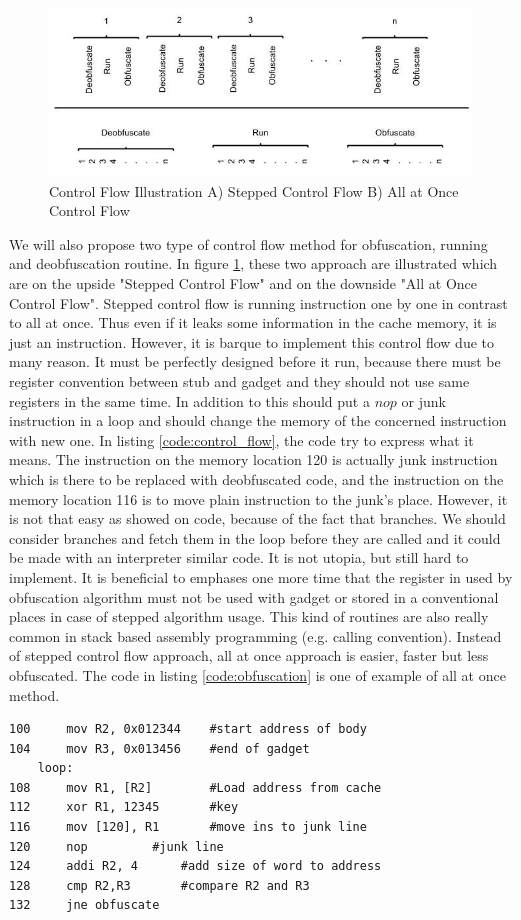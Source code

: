 		    \begin{figure}[h!]
	        \centering
	        \includegraphics[width=1\textwidth]{img/control_flow.jpg}
	        \caption{Control Flow Illustration A) Stepped Control Flow B) All at Once Control Flow}
	        \label{fig:controlflow}
	    \end{figure}
	        We will also propose two type of control flow method for obfuscation, running and deobfuscation routine. In figure \ref{fig:controlflow}, these two approach are illustrated which are on the upside "Stepped Control Flow" and on the downside "All at Once Control Flow". Stepped control flow is running instruction one by one in contrast to all at once. Thus even if it leaks some information in the cache memory, it is just an instruction. However, it is barque to implement this control flow due to many reason. It must be perfectly designed before it run, because there must be register convention between stub and gadget and they should not use same registers in the same time. In addition to this should put a $nop$ or junk instruction in a loop and should change the memory of the concerned instruction with new one. In listing \ref{code:control_flow}, the code try to express what it means. The instruction on the memory location 120 is actually junk instruction which is there to be replaced with deobfuscated code, and the instruction on the memory location 116 is to move plain instruction to the junk's place. However, it is not that easy as showed on code, because of the fact that branches. We should consider branches and fetch them in the loop before they are called and it could be made with an interpreter similar code. It is not utopia, but still hard to implement. It is beneficial to emphases one more time that the register in used by obfuscation algorithm must not be used with gadget or stored in a conventional places in case of stepped algorithm usage. This kind of routines are also really common in stack based assembly programming (e.g. calling convention). Instead of stepped control flow approach, all at once approach is easier, faster but less obfuscated. The code in listing \ref{code:obfuscation} is one of example of all at once method. 
	    \begin{lstlisting}[caption=The code example of stepped control flow approach, label=code:control_flow]
100		mov R2, 0x012344 	#start address of body
104		mov R3, 0x013456 	#end of gadget
	loop: 
108		mov R1, [R2] 		#Load address from cache
112		xor R1, 12345 		#key
116		mov [120], R1 		#move ins to junk line
120		nop			#junk line
124		addi R2, 4 		#add size of word to address
128		cmp R2,R3 		#compare R2 and R3
132		jne obfuscate
		\end{lstlisting}


